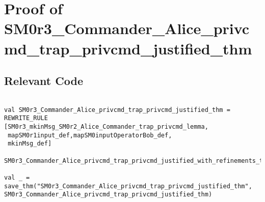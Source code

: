 \documentclass{report}
\begin{document}
\section{Proof of SM0r3_Commander_Alice_privcmd_trap_privcmd_justified_thm}
\label{proof-7}

\subsection{Relevant Code}
\label{rel-code-7}
\begin{lstlisting}[frame=TBlr]

val SM0r3_Commander_Alice_privcmd_trap_privcmd_justified_thm =
REWRITE_RULE
[SM0r3_mkinMsg_SM0r2_Alice_Commander_trap_privcmd_lemma,
 mapSM0r1input_def,mapSM0inputOperatorBob_def,
 mkinMsg_def]
 SM0r3_Commander_Alice_privcmd_trap_privcmd_justified_with_refinements_thm

val _ = save_thm("SM0r3_Commander_Alice_privcmd_trap_privcmd_justified_thm", SM0r3_Commander_Alice_privcmd_trap_privcmd_justified_thm)


\end{lstlisting}
\end{document}
